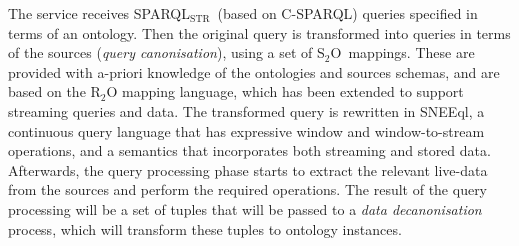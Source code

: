 \documentclass[runningheads,a4paper]{llncs}
\newcommand{\subscript}[1]{\ensuremath{_{\textrm{#1}}}}
\newcommand{\rtwoo}{\textsf{R\subscript{2}O}}
\newcommand{\stwoo}{\textsf{S\subscript{2}O}}
\newcommand{\sparqlstr}{SPARQL\subscript{STR}}
\begin{document}
The service receives \sparqlstr\ (based on C-SPARQL\cite{Barbieri_09}) queries specified in terms of 
an ontology.
Then the original query is transformed into queries in terms of the sources (\textit{query canonisation}), using 
a set of \stwoo\ mappings. These are provided with a-priori knowledge of the ontologies and sources schemas, and are based on the \rtwoo\cite{Barrasa_04} mapping language, which has been extended to support  streaming queries and data. 
The transformed query is rewritten in SNEEql\cite{Brenninkmeijer_08},  a continuous query language that has expressive window and window-to-stream operations, and a semantics that incorporates both streaming and stored data.\
%
%
Afterwards, the query processing phase starts %
to extract the relevant live-data from the sources and perform the required operations.
%
The result of the query processing will be a set of tuples that will be passed to a \textit{data decanonisation} process, which will transform these tuples to ontology instances.

\end{document}
